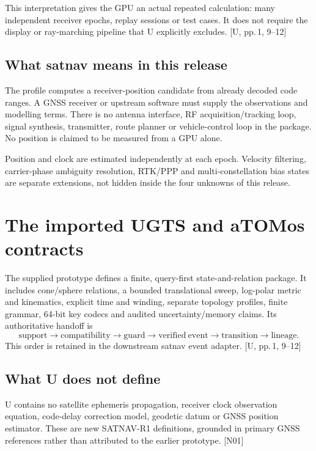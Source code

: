 \documentclass[11pt,a4paper]{article}
\newcommand{\src}[1]{\textcolor{muted}{[U, #1]}}
\newcommand{\dec}[1]{\textcolor{accent}{[N#1]}}
\begin{document}
This interpretation gives the GPU an actual repeated calculation: many independent
receiver epochs, replay sessions or test cases. It does not require the display or
ray-marching pipeline that U explicitly excludes. \src{pp.\,1, 9--12}

\subsection*{What satnav means in this release}
The profile computes a receiver-position candidate from already decoded code ranges.
A GNSS receiver or upstream software must supply the observations and modelling terms.
There is no antenna interface, RF acquisition/tracking loop, signal synthesis,
transmitter, route planner or vehicle-control loop in the package. No position is
claimed to be measured from a GPU alone.

Position and clock are estimated independently at each epoch. Velocity filtering,
carrier-phase ambiguity resolution, RTK/PPP and multi-constellation bias states are
separate extensions, not hidden inside the four unknowns of this release.
\clearpage
\tableofcontents
\clearpage


\section{The imported UGTS and aTOMos contracts}
The supplied prototype defines a finite, query-first state-and-relation package. It
includes cone/sphere relations, a bounded translational sweep, log-polar metric and
kinematics, explicit time and winding, separate topology profiles, finite grammar,
64-bit key codecs and audited uncertainty/memory claims. Its authoritative handoff is
\begin{equation}
\mathrm{support}\to\mathrm{compatibility}\to\mathrm{guard}\to\mathrm{verified\ event}
\to\mathrm{transition}\to\mathrm{lineage}.
\end{equation}
This order is retained in the downstream satnav event adapter. \src{pp.\,1, 9--12}

\subsection{What U does not define}
U contains no satellite ephemeris propagation, receiver clock observation equation,
code-delay correction model, geodetic datum or GNSS position estimator. These are
new SATNAV-R1 definitions, grounded in primary GNSS references rather than attributed
to the earlier prototype. \dec{01}
\end{document}
